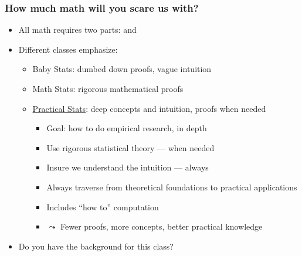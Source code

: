 \documentclass[aspectratio=169]{beamer}
\begin{document}
    \begin{frame}
        \frametitle{How much math will you scare us with?}
        \begin{itemize}
            \item All math requires two parts:  and
            \item Different classes emphasize:
            \begin{itemize}
                \item \alert{Baby Stats}: dumbed down proofs, vague intuition
                \item \alert{Math Stats}: rigorous mathematical proofs
                \item \alert{\underline{Practical Stats}}: deep concepts and
                intuition, proofs when needed
                \begin{itemize}
                    \item Goal: how to do empirical research, in depth
                    \item Use rigorous statistical theory --- when needed
                    \item Insure we understand the intuition --- always
                    \item Always traverse from theoretical foundations to practical
                    applications
                    \item Includes ``how to'' computation
                    \item $\leadsto$ Fewer proofs, more concepts, better practical
                    knowledge
                \end{itemize}
            \end{itemize}
            \item Do you have the background for this class? 
        \end{itemize}
    \end{frame}
\end{document}
